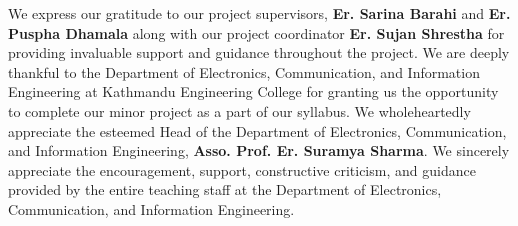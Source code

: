 We express our gratitude to our project supervisors, \textbf{Er. Sarina Barahi} and \textbf{Er. Puspha Dhamala} along with our project coordinator\textbf{ Er. Sujan Shrestha} for providing invaluable support and guidance throughout the project. We are deeply thankful to the Department of Electronics, Communication, and Information Engineering at Kathmandu Engineering College for granting us the opportunity to complete our minor project as a part of our syllabus. We wholeheartedly appreciate the esteemed Head of the Department of Electronics, Communication, and Information Engineering, \textbf{Asso. Prof. Er. Suramya Sharma}. We sincerely appreciate the encouragement, support, constructive criticism, and guidance provided by the entire teaching staff at the Department of Electronics, Communication, and Information Engineering.
